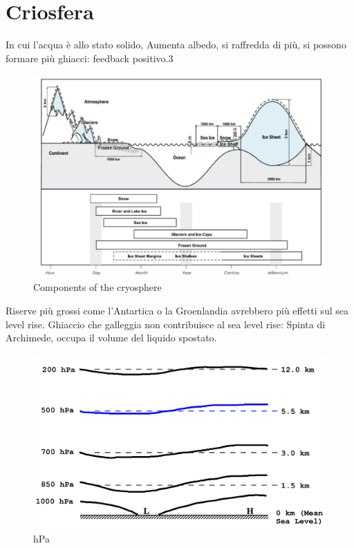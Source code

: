 \section{Criosfera} In cui l'acqua è allo stato solido, Aumenta albedo, si raffredda di più, si possono formare più ghiacci: feedback positivo.3
\begin{figure}[htpb]
    \centering
    \includegraphics[width=0.5\linewidth]{uploads/criosfera.png}
    \caption{Components of the cryosphere}
    \label{fig:criosfera}
\end{figure}
Riserve più grossi come l'Antartica o la Groenlandia avrebbero più effetti sul sea level rise. Ghiaccio che galleggia non contribuisce al sea level rise: Spinta di Archimede, occupa il volume del liquido spostato.
\begin{figure}
    \centering
    \includegraphics[width=0.5\linewidth]{uploads/hPa.png}
    \caption{hPa}
\end{figure}